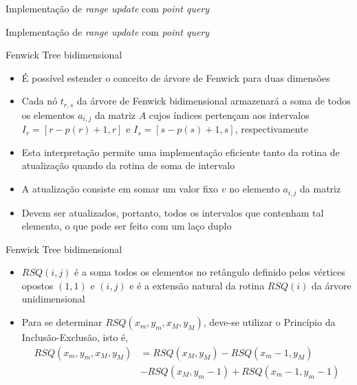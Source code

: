 \begin{frame}[fragile]{Implementação de {\it range update} com {\it point query}}
\end{frame}

\begin{frame}[fragile]{Implementação de {\it range update} com {\it point query}}
\end{frame}

\begin{frame}[fragile]{Fenwick Tree bidimensional}

    \begin{itemize}
        \item É possível estender o conceito de árvore de Fenwick para duas dimensões

        \item Cada nó $t_{r,s}$ da árvore de Fenwick bidimensional armazenará a soma de todos
            os elementos $a_{i,j}$ da matriz $A$ cujos índices pertençam aos intervalos
            $I_r = [r - p(r) + 1, r]$ e $I_s = [s - p(s) + 1, s]$, respectivamente

        \item Esta interpretação permite uma implementação eficiente tanto da rotina de 
            atualização quando da rotina de soma de intervalo

        \item A atualização consiste em somar um valor fixo $v$ no elemento $a_{i,j}$ da matriz

        \item Devem ser atualizados, portanto, todos os intervalos que contenham tal elemento,
            o que pode ser feito com um laço duplo
    \end{itemize}

\end{frame}

\begin{frame}[fragile]{Fenwick Tree bidimensional}

    \begin{itemize}
        \item $RSQ(i, j)$ é a soma todos os elementos no retângulo definido pelos vértices
            opostos $(1, 1)$ e $(i, j)$ e é a extensão natural da rotina $RSQ(i)$ da árvore
            unidimensional

        \item Para se determinar $RSQ(x_m, y_m, x_M, y_M)$, deve-se utilizar o Princípio da
            Inclusão-Exclusão, isto é,
        \begin{align*}
            RSQ(x_m, y_m, x_M, y_M) &= RSQ(x_M, y_M) - RSQ(x_m - 1, y_M) \\
                &- RSQ(x_M, y_m - 1) + RSQ(x_m - 1, y_m - 1)
        \end{align*}
    \end{itemize}
\end{frame}

